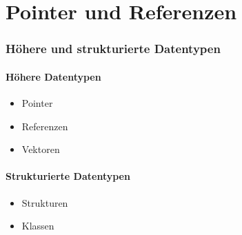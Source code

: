 
\part{Pointer und Referenzen}

\section{Höhere und strukturierte Datentypen}

\begin{multicols}{2}
\subsection{Höhere Datentypen}
\begin{itemize}
	\item Pointer
	\item Referenzen
	\item Vektoren
\end{itemize}
\columnbreak
\subsection{Strukturierte Datentypen}
\begin{itemize}
	\item Strukturen
	\item Klassen
\end{itemize}
\end{multicols}

